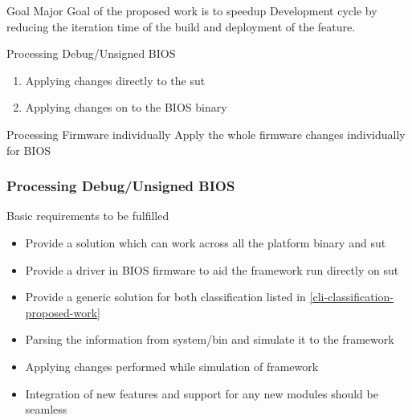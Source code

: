 
\begin{frame}{Goal}
    Major Goal of the proposed work is to speedup Development cycle by reducing the iteration time of the build and deployment of the feature.

    \begin{redblock}{Processing Debug/Unsigned BIOS}
        \begin{enumerate}\label{cli-classification-proposed-work}
            \item Applying changes directly to the \gls{sut}
            \item Applying changes on to the BIOS binary
        \end{enumerate}
    \end{redblock}
    
    \begin{greenblock}{Processing Firmware individually}
        Apply the whole firmware changes individually for BIOS
    \end{greenblock}
\end{frame}


\subsubsection{Processing Debug/Unsigned BIOS}

\begin{frame}[allowframebreaks]{Basic requirements to be fulfilled}
    \begin{itemize}
        \item Provide a solution which can work across all the platform binary and \gls{sut}
        \item Provide a driver in BIOS firmware to aid the framework run directly on \gls{sut}
        \item Provide a generic solution for both classification listed in \ref{cli-classification-proposed-work}
        \item Parsing the information from system/bin and simulate it to the framework
        \item Applying changes performed while simulation of framework
        \item Integration of new features and support for any new modules should be seamless
    \end{itemize}
\end{frame}

